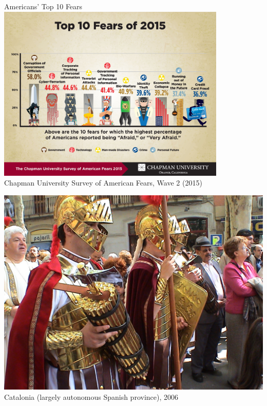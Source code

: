 \begin{frame}{Americans' Top 10 Fears}
    \centering
    \includegraphics[width=0.82\textwidth]{img/Top10Fears.jpg} \\
    Chapman University Survey of American Fears, Wave 2 (2015) \\
\end{frame}

\begin{frame}
    \centering
    \includegraphics[width=.9\textwidth]{img/fasces/fake-fasces.jpg} \\
    Catalonia (largely autonomous Spanish province), 2006 \\
\end{frame}

